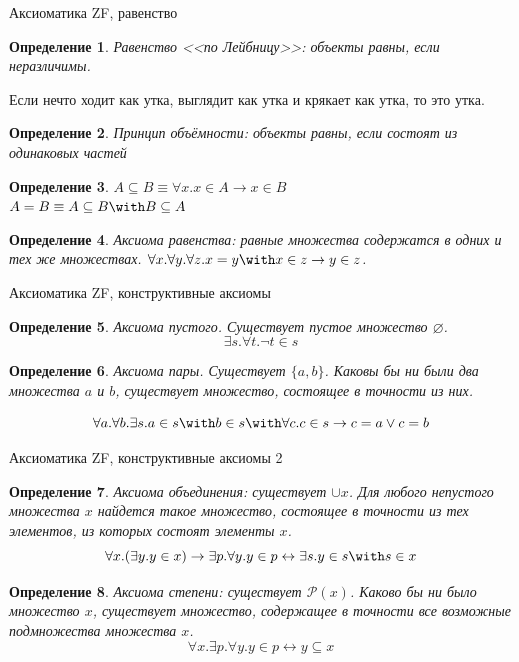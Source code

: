 \documentclass[aspectratio=169]{beamer}
\newtheorem{dfn}{Определение}[section]
\begin{document}
\newcommand\doubleplus{+\kern-1.3ex+\kern0.8ex}
\newcommand\mdoubleplus{\ensuremath{\mathbin{+\mkern-10mu+}}}


\begin{frame}{Аксиоматика ZF, равенство}
\begin{dfn} Равенство <<по Лейбницу>>: объекты равны, если неразличимы.\end{dfn} Если нечто ходит как утка, выглядит как 
утка и крякает как утка, то это утка.\pause
\begin{dfn} Принцип объёмности: объекты равны, если состоят из одинаковых частей\end{dfn}\pause

\begin{dfn} $A \subseteq B \equiv \forall x.x \in A \rightarrow x \in B$ \\\pause
 $A = B \equiv A \subseteq B \with B \subseteq A$ \end{dfn}\pause
\begin{dfn} Аксиома равенства: равные множества содержатся в одних и тех же множествах. 
$\forall x. \forall y. \forall z. x = y \with x \in z \rightarrow y \in z$.
\end{dfn}
\end{frame}

\begin{frame}{Аксиоматика ZF, конструктивные аксиомы}
\begin{dfn} Аксиома пустого. Существует пустое множество $\varnothing$. $$\exists s.\forall t.\neg t \in s$$ \end{dfn}\pause
\begin{dfn} Аксиома пары. Существует $\{a,b\}$.
Каковы бы ни были два множества $a$ и $b$, существует множество, состоящее 
в точности из них. 

$$\forall a.\forall b.\exists s.a \in s \with b \in s \with \forall c.c \in s \rightarrow c = a \vee c = b$$ \end{dfn}
\end{frame}

\begin{frame}{Аксиоматика ZF, конструктивные аксиомы 2}
\begin{dfn} Аксиома объединения: существует $\cup x$. 
Для любого непустого множества $x$ найдется такое множество, состоящее в точности
из тех элементов, из которых состоят элементы $x$. 
$$\forall x.(\exists y.y \in x) \rightarrow \exists p.\forall y.y \in p \leftrightarrow \exists s.y \in s \with s \in x$$
 \end{dfn}\pause
\begin{dfn} Аксиома степени: существует $\mathcal{P}(x)$.
Каково бы ни было множество $x$, существует множество, содержащее в точности
все возможные подмножества множества $x$.
$$\forall x.\exists p.\forall y.y \in p \leftrightarrow y \subseteq x$$
\end{dfn}
\end{frame}
\end{document}
